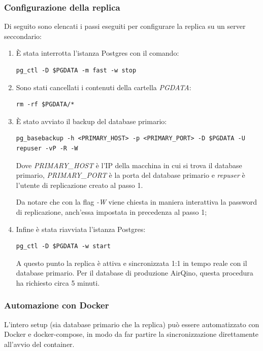 \subsubsection{Configurazione della replica}\label{conf-repl}
Di seguito sono elencati i passi eseguiti per configurare la replica su un server seccondario:

\begin{enumerate}
  \item È stata interrotta l'istanza Postgres con il comando:
  \vspace{1mm}
\begin{lstlisting}[]
pg_ctl -D $PGDATA -m fast -w stop
\end{lstlisting}
  \item Sono stati cancellati i contenuti della cartella \textit{PGDATA}:
  \vspace{1mm}
\begin{lstlisting}[]
rm -rf $PGDATA/*
\end{lstlisting}
  \item È stato avviato il backup del database primario:
  \vspace{1mm}
\begin{lstlisting}[]
pg_basebackup -h <PRIMARY_HOST> -p <PRIMARY_PORT> -D $PGDATA -U repuser -vP -R -W
\end{lstlisting}
Dove \textit{PRIMARY\_HOST} è l'IP della macchina in cui si trova il database primario, \textit{PRIMARY\_PORT} è la porta del database primario e \textit{repuser} è l'utente di replicazione creato al passo 1.

Da notare che con la flag \textit{-W} viene chiesta in maniera interattiva la password di replicazione, anch'essa impostata in precedenza al passo 1;
  \item Infine è stata riavviata l'istanza Postgres:
  \vspace{1mm}
\begin{lstlisting}[]
pg_ctl -D $PGDATA -w start
\end{lstlisting}
A questo punto la replica è attiva e sincronizzata 1:1 in tempo reale con il database primario. Per il database di produzione AirQino, questa procedura ha richiesto circa 5 minuti.
\end{enumerate}

\subsubsection{Automazione con Docker}
L'intero setup (sia database primario che la replica) può essere automatizzato con Docker e docker-compose, in modo da far partire la sincronizzazione direttamente all'avvio del container.

